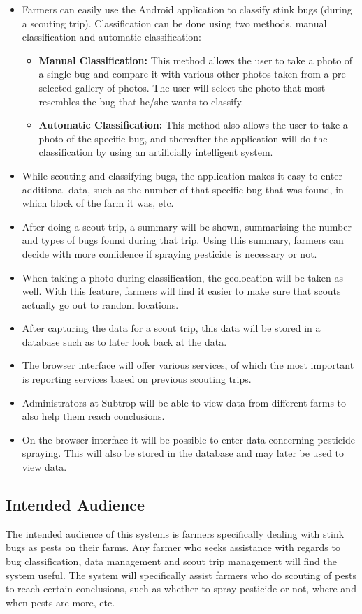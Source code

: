 \documentclass[11pt,a4paper,titlepage]{article}
\begin{document}
	\begin{itemize}
		\item Farmers can easily use the Android application to classify stink bugs (during a scouting trip). Classification can be done using two methods, manual classification and automatic classification:
		\begin{itemize}
			\item \textbf{Manual Classification:} This method allows the user to take a photo of a single bug and compare it with various other photos taken from a pre-selected gallery of photos. The user will select the photo that most resembles the bug that he/she wants to classify.
			\item \textbf{Automatic Classification:} This method also allows the user to take a photo of the specific bug, and thereafter the application will do the classification by using an artificially intelligent system. 
		\end{itemize}
		\item While scouting and classifying bugs, the application makes it easy to enter additional data, such as the number of that specific bug that was found, in which block of the farm it was, etc.
		\item After doing a scout trip, a summary will be shown, summarising the number and types of bugs found during that trip. Using this summary, farmers can decide with more confidence if spraying pesticide is necessary or not.
		\item When taking a photo during classification, the geolocation will be taken as well. With this feature, farmers will find it easier to make sure that scouts actually go out to random locations.
		\item After capturing the data for a scout trip, this data will be stored in a database such as to later look back at the data.
		\item The browser interface will offer various services, of which the most important is reporting services based on previous scouting trips.
		\item Administrators at Subtrop will be able to view data from different farms to also help them reach conclusions.
		\item On the browser interface it will be possible to enter data concerning pesticide spraying. This will also be stored in the database and may later be used to view data.
	\end{itemize}
	
\subsection{Intended Audience}
The intended audience of this systems is farmers specifically dealing with stink bugs as pests on their farms. Any farmer who seeks assistance with regards to bug classification, data management and scout trip management will find the system useful. The system will specifically assist farmers who do scouting of pests to reach certain conclusions, such as whether to spray pesticide or not, where and when pests are more, etc.
\end{document}
